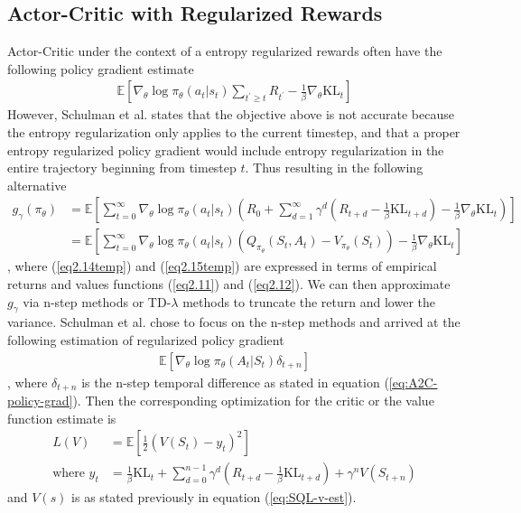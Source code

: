 \documentclass[12pt]{report}
\begin{document}
\subsection{Actor-Critic with Regularized Rewards} \label{sec:ac_reg}

Actor-Critic under the context of a entropy regularized rewards often \cite{williams1992simple} have the following policy gradient estimate
\begin{align}
    \mathbb{E}\left[\nabla_\theta \log \pi_\theta(a_t|s_t)\sum_{t^\prime \ge t} R_{t^\prime} - \frac{1}{\beta}\nabla_\theta \text{KL}_t\right]
\end{align}
However, Schulman et al. \cite{schulman2017equivalence} states that the objective above is not accurate because the entropy regularization only applies to the current timestep, and that a proper entropy regularized policy gradient would include entropy regularization in the entire trajectory beginning from timestep $t$. Thus resulting in the following alternative
\begin{align}
    g_\gamma(\pi_\theta)&=\mathbb{E}\left[\sum_{t=0}^\infty\nabla_\theta \log \pi_\theta(a_t|s_t)\left(R_0 + \sum_{d=1}^\infty \gamma^d \left(R_{t+d}-\frac{1}{\beta}\text{KL}_{t+d}\right)-\frac{1}{\beta}\nabla_\theta \text{KL}_{t} \right)\right] \label{eq2.14temp}\\
    &=\mathbb{E}\left[\sum_{t=0}^\infty\nabla_\theta \log \pi_\theta(a_t|s_t)(Q_{\pi_\theta}(S_t,A_t)-V_{\pi_\theta}(S_t))-\frac{1}{\beta}\nabla_\theta \text{KL}_t\right] \label{eq2.15temp}
\end{align}
, where (\ref{eq2.14temp}) and (\ref{eq2.15temp}) are expressed in terms of empirical returns and values functions (\ref{eq2.11}) and (\ref{eq2.12}). We can then approximate $g_\gamma$ via n-step methods \cite{mnih2016asynchronous} or TD-$\lambda$ methods \cite{schulman2015high} to truncate the return and lower the variance. Schulman et al. \cite{schulman2017equivalence} chose to focus on the n-step methods and arrived at the following estimation of regularized policy gradient
\begin{align}
    \mathbb{E}\left[\nabla_\theta \log \pi_\theta(A_t|S_t)\delta_{t+n}\right]
\end{align}
, where $\delta_{t+n}$ is the n-step temporal difference as stated in equation (\ref{eq:A2C-policy-grad}). Then the corresponding optimization for the critic or the value function estimate is
\begin{align}
    L(V) &= \mathbb{E}\left[\frac{1}{2}(V(S_t)-y_t)^2\right]\\
    \text{where } y_t &=\frac{1}{\beta}\text{KL}_t + \sum_{d=0}^{n-1} \gamma^d\left(R_{t+d}-\frac{1}{\beta}\text{KL}_{t+d}\right) + \gamma^n V(S_{t+n}) \label{eq:v-hat-mdp-rollout}
\end{align}
and $V(s)$ is as stated previously in equation (\ref{eq:SQL-v-est}).
\end{document}
